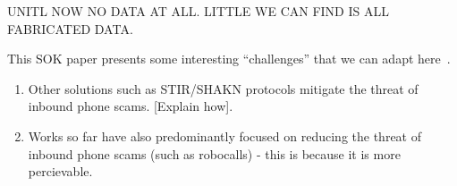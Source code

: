 UNITL NOW NO DATA AT ALL. LITTLE WE CAN FIND IS ALL FABRICATED DATA. 


This SOK paper presents some interesting ``challenges'' that we can adapt here~\cite{TuDZA16}.


\begin{enumerate}

\item Other solutions such as STIR/SHAKN protocols mitigate the threat of inbound phone scams. [Explain how]. 
\item Works so far have also predominantly focused on reducing the threat of inbound phone scams (such as robocalls) - this is because it is more percievable.
\end{enumerate}